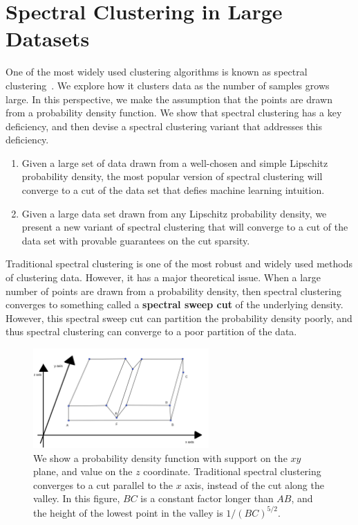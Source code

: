   \section{Spectral Clustering in Large
    Datasets}\label{sec:spectral-limit}

  One of the most widely used clustering algorithms is known as
  spectral clustering~\cite{NgSpectral01}. We explore how it clusters data as the number of
  samples grows large. In this perspective, we make the assumption that
  the points are drawn from a probability density function. We show that
  spectral clustering has a key deficiency, and then devise a spectral
  clustering variant that addresses this deficiency. 

  \begin{enumerate}
  \item Given a large set of data drawn from a well-chosen and simple Lipschitz probability
  density, the most popular version of spectral clustering will converge to a cut of
  the data set that defies machine learning intuition.
  \item Given a large data set drawn from any Lipschitz probability
  density, we present a new variant of spectral clustering that will
  converge to a cut of the data set with provable guarantees on
  the cut sparsity.
  \end{enumerate}
  
Traditional spectral clustering is one of the most robust and widely
used methods of clustering data. However, it has a major theoretical
issue. When a large number of points are drawn from a probability
density, then spectral clustering converges to something called a
\textbf{spectral sweep cut} of the underlying density.  However, this
spectral sweep cut can partition the probability density poorly, and
thus spectral clustering can converge to a poor partition of the data.

\begin{figure}[htbp]
\centering
\includegraphics[width=0.6\textwidth]{images/counterexample.png}
\caption{
  We show a probability density function with support on the $xy$ plane,
  and value on the $z$ coordinate.  Traditional spectral clustering converges to a cut
  parallel to the $x$ axis, instead of the cut along the valley.
    In this figure,
  $BC$ is a constant
  factor longer than $AB$, and the height of the lowest point in the
  valley is
  $1/(BC)^{5/2}$. 
 }
\label{fig:spec}
\end{figure}

